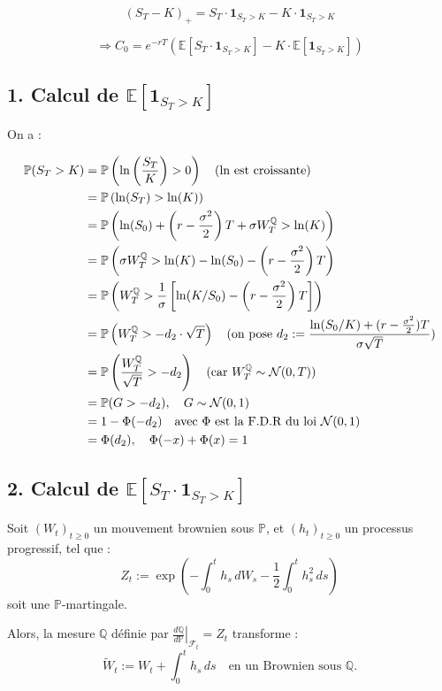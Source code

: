 \[
(S_T - K)_+ = S_T \cdot \mathbf{1}_{S_T > K} - K \cdot \mathbf{1}_{S_T > K}
\]

\[
\Rightarrow C_0 = e^{-rT} \left( \mathbb{E}[S_T \cdot \mathbf{1}_{S_T > K}] - K \cdot \mathbb{E}[ \mathbf{1}_{S_T > K}] \right)
\]


\subsection*{1. Calcul de \( \mathbb{E}[ \mathbf{1}_{S_T > K}] \)}

On a :


\begin{align*}
\mathbb{P}(S_T > K) 
&= \mathbb{P}\left( \ln\left( \frac{S_T}{K} \right) > 0 \right) 
\quad \text{(\(\ln\) est croissante)} \\
&= \mathbb{P}\left( \ln(S_T) > \ln(K) \right) \\
&= \mathbb{P}\left( \ln(S_0) + \left(r - \frac{\sigma^2}{2}\right)T + \sigma W_T^{\mathbb{Q}} > \ln(K) \right) 
 \\
&= \mathbb{P}\left( \sigma W_T^{\mathbb{Q}} > \ln(K) - \ln(S_0) - \left(r - \frac{\sigma^2}{2}\right)T \right) \\
&= \mathbb{P}\left( W_T^{\mathbb{Q}} > \frac{1}{\sigma} \left[ \ln(K/S_0) - \left(r - \frac{\sigma^2}{2}\right)T \right] \right) \\
&= \mathbb{P}\left( W_T^{\mathbb{Q}} > -d_2 \cdot \sqrt{T} \right) 
\quad \text{(on pose \( d_2 := \frac{\ln(S_0/K) + (r - \frac{\sigma^2}{2})T}{\sigma \sqrt{T}} \))} \\
&= \mathbb{P}\left( \frac{W_T^{\mathbb{Q}}}{\sqrt{T}} > -d_2 \right) 
\quad \text{(car \( W_T^{\mathbb{Q}} \sim \mathcal{N}(0, T) \))} \\
&= \mathbb{P}(G > -d_2), \quad G \sim \mathcal{N}(0,1) \\
&= 1 - \Phi(-d_2) \quad \text{avec $\Phi$ est la F.D.R du loi $\mathcal{N}(0,1)$} \\
&= \Phi(d_2) , \quad \Phi(-x) + \Phi(x) = 1
\end{align*}


\subsection*{2. Calcul de \( \mathbb{E}[S_T \cdot \mathbf{1}_{S_T > K}] \)}

\begin{rappelBox}
Soit \( (W_t)_{t \geq 0} \) un mouvement brownien sous \( \mathbb{P} \), et \( (h_t)_{t \geq 0} \) un processus progressif, tel que :
\[
Z_t := \exp\left( -\int_0^t h_s\, dW_s - \frac{1}{2} \int_0^t h_s^2\, ds \right)
\]
soit une \( \mathbb{P} \)-martingale.

Alors, la mesure \( \mathbb{Q} \) définie par \( \left. \frac{d\mathbb{Q}}{d\mathbb{P}} \right|_{\mathcal{F}_t} = Z_t \) transforme :
\[
\widetilde{W}_t := W_t + \int_0^t h_s\, ds
\quad \text{en un Brownien sous } \mathbb{Q}.
\]
\end{rappelBox}

